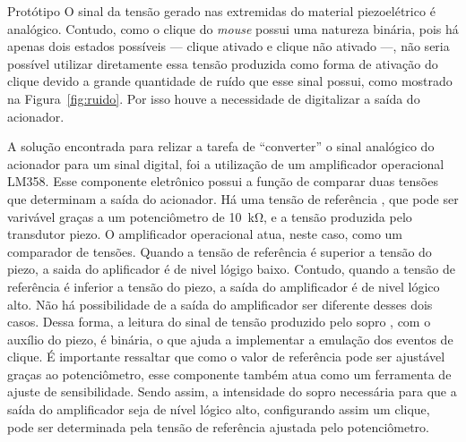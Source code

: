 \begin{chapter}{Protótipo}
O sinal da tensão gerado nas extremidas do material piezoelétrico é analógico.
Contudo, como o clique do \textit{mouse} possui uma natureza binária, pois há
apenas dois estados possíveis --- clique ativado e clique não ativado ---, não
seria possível utilizar diretamente essa tensão produzida como forma de ativação
do clique devido a grande quantidade de ruído que esse sinal possui, como
mostrado na Figura~\ref{fig:ruido}. Por isso houve a necessidade de digitalizar
a saída do acionador.

A solução encontrada para relizar a tarefa de ``converter'' o sinal analógico
do acionador para um sinal digital, foi a utilização de um amplificador
operacional LM358. Esse componente eletrônico possui a função de comparar duas
tensões que determinam a saída do acionador. Há uma tensão de referência
, que pode ser varivável graças a um potenciômetro de 10~k\si{\ohm}, e a tensão
produzida pelo transdutor piezo. O amplificador operacional atua, neste caso,
como um comparador de tensões. Quando a tensão de referência é superior a tensão
do piezo, a saida do aplificador é de nivel lógigo baixo. Contudo, quando a
tensão de referência é inferior a tensão do piezo, a saída do amplificador é de
nivel lógico alto. Não há possibilidade de a saída do amplificador ser diferente
desses dois casos. Dessa forma, a leitura do sinal de tensão produzido pelo sopro
, com o auxílio do piezo, é binária, o que ajuda a implementar a emulação dos
eventos de clique. É importante ressaltar que como o valor de referência 
pode ser ajustável graças ao potenciômetro, esse componente também atua como um
ferramenta de ajuste de sensibilidade. Sendo assim, a intensidade do sopro
necessária para que a saída do amplificador seja de nível lógico alto,
configurando assim um clique, pode ser determinada pela tensão de referência
ajustada pelo potenciômetro.

\end{chapter}
